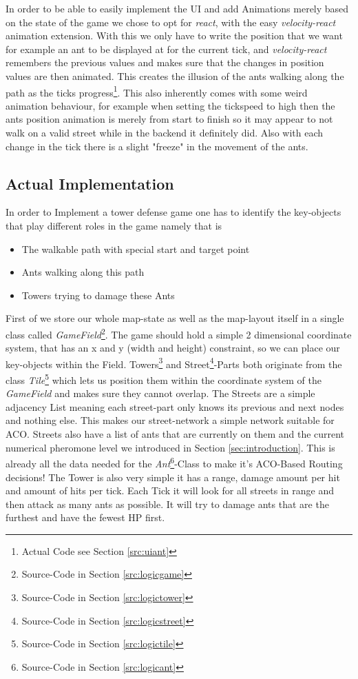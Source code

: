 In order to be able to easily implement the UI and add Animations merely based on the state of the game we chose to opt for \textit{react}\cite{libsreact}, with the easy \textit{velocity-react}\cite{libsreactvelocity} animation extension. With this we only have to write the position that we want for example an ant to be displayed at for the current tick, and \textit{velocity-react} remembers the previous values and makes sure that the changes in position values are then animated. This creates the illusion of the ants walking along the path as the ticks progress\footnote{Actual Code see Section \ref{src:uiant}}. This also inherently comes with some weird animation behaviour, for example when setting the tickspeed to high then the ants position animation is merely from start to finish so it may appear to not walk on a valid street while in the backend it definitely did. Also with each change in the tick there is a slight "freeze" in the movement of the ants.

\subsection{Actual Implementation}
\label{sec:implementationactual}

In order to Implement a tower defense game one has to identify the key-objects that play different roles in the game namely that is
\begin{itemize}
\item The walkable path with special start and target point
\item Ants walking along this path
\item Towers trying to damage these Ants
\end{itemize}
First of we store our whole map-state as well as the map-layout itself in a single class called \textit{GameField}\footnote{Source-Code in Section \ref{src:logicgame}}. The game should hold a simple 2 dimensional coordinate system, that has an x and y (width and height) constraint, so we can place our key-objects within the Field. Towers\footnote{Source-Code in Section \ref{src:logictower}} and Street\footnote{Source-Code in Section \ref{src:logicstreet}}-Parts both originate from the class \textit{Tile}\footnote{Source-Code in Section \ref{src:logictile}} which lets us position them within the coordinate system of the \textit{GameField} and makes sure they cannot overlap.
The Streets are a simple adjacency List meaning each street-part only knows its previous and next nodes and nothing else. This makes our street-network a simple network suitable for ACO. Streets also have a list of ants that are currently on them and the current numerical pheromone level we introduced in Section \ref{sec:introduction}. This is already all the data needed for the \textit{Ant}\footnote{Source-Code in Section \ref{src:logicant}}-Class to make it's ACO-Based Routing decisions!
The Tower is also very simple it has a range, damage amount per hit and amount of hits per tick. Each Tick it will look for all streets in range and then attack as many ants as possible. It will try to damage ants that are the furthest and have the fewest HP first.


